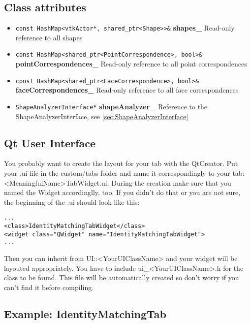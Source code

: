\subsection{Class attributes}
\begin{itemize}
	\item \texttt{const HashMap<vtkActor*, shared\_ptr<Shape>>\&} \textbf{shapes\_} Read-only reference to all shapes
	\item \texttt{const HashMap<shared\_ptr<PointCorrespondence>, bool>\&} \textbf{pointCorrespondences\_} Read-only reference to all point correspondences
	\item \texttt{const HashMap<shared\_ptr<FaceCorrespondence>, bool>\&} \textbf{faceCorrespondences\_} Read-only reference to all face correspondences
	\item \texttt{ShapeAnalyzerInterface*} \textbf{shapeAnalyzer\_} Reference to the ShapeAnalyzerInterface, see \ref{sec:ShapeAnalyzerInterface}
\end{itemize}

\subsection{Qt User Interface}
\label{subsec:QtUI}

You probably want to create the layout for your tab with the QtCreator. Put your .ui file in the custom/tabs folder and name it correspondingly to your tab: <MeaningfulName>TabWidget.ui. During the creation make sure that you named the Widget accordinglly, too. If you didn't do that or you are not sure, the beginning of the .ui should look like this: 

\begin{lstlisting}[style=lstStyleCpp, caption={IdentityMatchingTabWidget.ui}]
...
<class>IdentityMatchingTabWidget</class>
<widget class="QWidget" name="IdentityMatchingTabWidget">
...
\end{lstlisting}

Then you can inherit from UI::<YourUIClassName> and your widget will be layouted appropriately. You have to include ui\_<YourUIClassName>.h for the class to be found. This file will be automatically created so don't worry if you can't find it before compiling. 


\subsection{Example: IdentityMatchingTab}
\label{subsec:ExampleIdentityMatchingTab}

